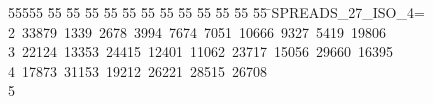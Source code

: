 %
%
\begin{tabbing}
55555 \= 55 \= 55 \= 55 \= 55 \= 55 \= 55 \= 55 \= 55 \= 55 \= 55 \= 55 \= 55 \= \>SPREADS\_27\_ISO\_4=\\[0pt]
2\ 33879\ 1339\ 2678\ 3994\ 7674\ 7051\ 10666\ 9327\ 5419\ 19806\ \\[0pt]
3\ 22124\ 13353\ 24415\ 12401\ 11062\ 23717\ 15056\ 29660\ 16395\ \\[0pt]
4\ 17873\ 31153\ 19212\ 26221\ 28515\ 26708\\[0pt]
5\>\end{tabbing}
